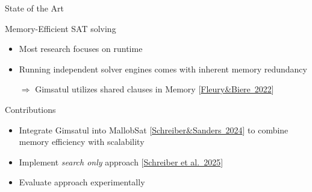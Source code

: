 \documentclass[]{sdqbeamer}
\begin{document}
\begin{frame}{State of the Art}
    \begin{block}{Memory-Efficient SAT solving}
        \begin{itemize}
            \item Most research focuses on runtime
            \item Running independent solver engines comes with inherent memory redundancy
            \item[$\Rightarrow$] Gimsatul utilizes shared clauses in Memory [\href{https://arxiv.org/pdf/2207.13577}{Fleury\&Biere~2022}]
        \end{itemize}
    \end{block}

    \begin{block}{Contributions}
        \begin{itemize}
            \item Integrate Gimsatul into MallobSat [\href{https://www.jair.org/index.php/jair/article/download/15827/27072}{Schreiber\&Sanders~2024}] to combine memory efficiency with scalability
            \item Implement \textit{search only} approach [\href{https://satres.kikit.kit.edu/papers/2025-sat-streamlining-pre.pdf}{Schreiber et al.~2025}]
            \item Evaluate approach experimentally
        \end{itemize}
    \end{block}
\end{frame}
\end{document}
